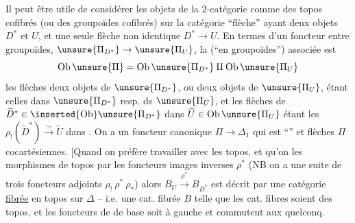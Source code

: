 Il peut être utile de considérer les
objets de la $2$-catégorie comme des topos cofibrés (ou des groupoïdes cofibrés) sur la catégorie ``flèche''
ayant deux objets $D^*$ et $U$, et une seule flèche non identique $D^*\to U$. En termes d'un foncteur entre groupoïdes, $\unsure{\Pi_{D^*}}\to\unsure{\Pi_U}$, la   (``en groupoïdes'') associée \inserted{$\unsure{\Pi}$} est   
\[
\mathrm{Ob}\,\unsure{\Pi}=\mathrm{Ob}\,\unsure{\Pi_{D^*}}\amalg\mathrm{Ob}\,\unsure{\Pi_U}
\]
les flèches   deux objets de $\unsure{\Pi_{D^*}}$, ou deux objets de $\unsure{\Pi_U}$, étant celles dans $\unsure{\Pi_{D^*}}$ resp. ds $\unsure{\Pi_U}$, et les flèches de $\widetilde D^*\in\inserted{\mathrm{Ob}}\unsure{\Pi_{D^*}}$ dans $\widetilde U\in\mathrm{Ob}\,\unsure{\Pi_U}$ étant les  $\rho_!(\widetilde D^*)\xrightarrow{\sim}\widetilde U$ dans .  On a un foncteur canonique $\Pi\to\Delta_1$ qui est ``'' et    flèches  $\Pi$ cocartésiennes. [Quand on préfère travailler
avec les topos, et qu'on  les morphismes \unsure{$\rho$} de topos par les foncteurs images inverses $\rho^*$ (NB on a une suite de trois foncteurs adjoints $\rho_!\ \rho^*\ \rho_*$) alors $B_U\xrightarrow{\rho^*}B_{D^*}$ est décrit par une catégorie  \uline{fibrée} en topos sur $\Delta$ -- i.e. une cat. fibrée $B$ telle que les cat. fibres soient des topos, et les foncteurs de  de base soit  à gauche et commutent aux \unsure{$\underset{\longrightarrow}{\lim}$} quelconq.

